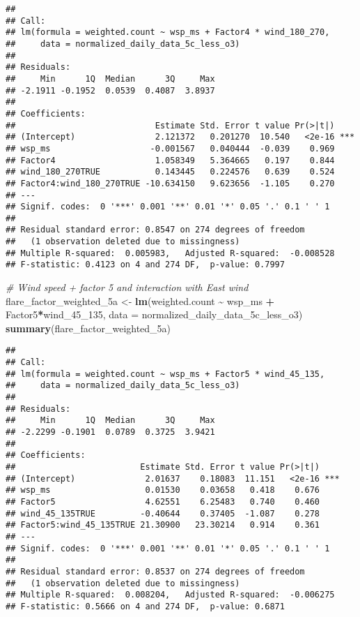 \documentclass[
]{article}
\newenvironment{Shaded}{\begin{snugshade}}{\end{snugshade}}
\newcommand{\AttributeTok}[1]{\textcolor[rgb]{0.13,0.29,0.53}{#1}}
\newcommand{\CommentTok}[1]{\textcolor[rgb]{0.56,0.35,0.01}{\textit{#1}}}
\newcommand{\FunctionTok}[1]{\textcolor[rgb]{0.13,0.29,0.53}{\textbf{#1}}}
\newcommand{\NormalTok}[1]{#1}
\newcommand{\OtherTok}[1]{\textcolor[rgb]{0.56,0.35,0.01}{#1}}
\newcommand{\SpecialCharTok}[1]{\textcolor[rgb]{0.81,0.36,0.00}{\textbf{#1}}}
\begin{document}
\begin{verbatim}
## 
## Call:
## lm(formula = weighted.count ~ wsp_ms + Factor4 * wind_180_270, 
##     data = normalized_daily_data_5c_less_o3)
## 
## Residuals:
##     Min      1Q  Median      3Q     Max 
## -2.1911 -0.1952  0.0539  0.4087  3.8937 
## 
## Coefficients:
##                            Estimate Std. Error t value Pr(>|t|)    
## (Intercept)                2.121372   0.201270  10.540   <2e-16 ***
## wsp_ms                    -0.001567   0.040444  -0.039    0.969    
## Factor4                    1.058349   5.364665   0.197    0.844    
## wind_180_270TRUE           0.143445   0.224576   0.639    0.524    
## Factor4:wind_180_270TRUE -10.634150   9.623656  -1.105    0.270    
## ---
## Signif. codes:  0 '***' 0.001 '**' 0.01 '*' 0.05 '.' 0.1 ' ' 1
## 
## Residual standard error: 0.8547 on 274 degrees of freedom
##   (1 observation deleted due to missingness)
## Multiple R-squared:  0.005983,   Adjusted R-squared:  -0.008528 
## F-statistic: 0.4123 on 4 and 274 DF,  p-value: 0.7997
\end{verbatim}

\begin{Shaded}
\begin{Highlighting}[]
\CommentTok{\# Wind speed + factor 5 and interaction with East wind}
\NormalTok{flare\_factor\_weighted\_5a }\OtherTok{\textless{}{-}} \FunctionTok{lm}\NormalTok{(weighted.count }\SpecialCharTok{\textasciitilde{}}\NormalTok{ wsp\_ms }\SpecialCharTok{+}\NormalTok{ Factor5}\SpecialCharTok{*}\NormalTok{wind\_45\_135, }
                               \AttributeTok{data =}\NormalTok{ normalized\_daily\_data\_5c\_less\_o3)}
\FunctionTok{summary}\NormalTok{(flare\_factor\_weighted\_5a)}
\end{Highlighting}
\end{Shaded}

\begin{verbatim}
## 
## Call:
## lm(formula = weighted.count ~ wsp_ms + Factor5 * wind_45_135, 
##     data = normalized_daily_data_5c_less_o3)
## 
## Residuals:
##     Min      1Q  Median      3Q     Max 
## -2.2299 -0.1901  0.0789  0.3725  3.9421 
## 
## Coefficients:
##                         Estimate Std. Error t value Pr(>|t|)    
## (Intercept)              2.01637    0.18083  11.151   <2e-16 ***
## wsp_ms                   0.01530    0.03658   0.418    0.676    
## Factor5                  4.62551    6.25483   0.740    0.460    
## wind_45_135TRUE         -0.40644    0.37405  -1.087    0.278    
## Factor5:wind_45_135TRUE 21.30900   23.30214   0.914    0.361    
## ---
## Signif. codes:  0 '***' 0.001 '**' 0.01 '*' 0.05 '.' 0.1 ' ' 1
## 
## Residual standard error: 0.8537 on 274 degrees of freedom
##   (1 observation deleted due to missingness)
## Multiple R-squared:  0.008204,   Adjusted R-squared:  -0.006275 
## F-statistic: 0.5666 on 4 and 274 DF,  p-value: 0.6871
\end{verbatim}
\end{document}
